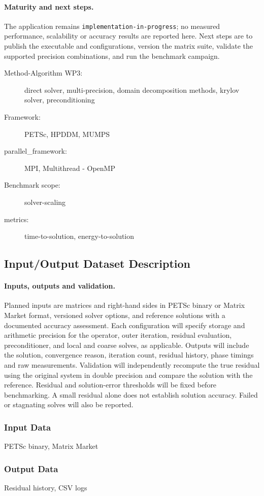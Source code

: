 \paragraph{Maturity and next steps.}
The application remains \texttt{implementation-in-progress}; no measured
performance, scalability or accuracy results are reported here.
Next steps are to publish the executable and configurations, version the
matrix suite, validate the supported precision combinations, and run the
benchmark campaign.

\begin{description}
  \item[Method-Algorithm WP3:] direct solver, multi-precision, domain decomposition methods, krylov solver, preconditioning
  \item[Framework:] PETSc, HPDDM, MUMPS
  \item[parallel\_framework:] MPI, Multithread - OpenMP
  \item[Benchmark scope:] solver-scaling
  \item[metrics:] time-to-solution, energy-to-solution
\end{description}

\subsection{Input/Output Dataset Description}

\paragraph{Inputs, outputs and validation.}
Planned inputs are matrices and right-hand sides in PETSc binary or Matrix
Market format, versioned solver options, and reference solutions with a
documented accuracy assessment. Each configuration will specify storage
and arithmetic precision for the operator, outer iteration, residual
evaluation, preconditioner, and local and coarse solves, as applicable.
Outputs will include the solution, convergence reason, iteration count,
residual history, phase timings and raw measurements.
Validation will independently recompute the true residual using the original
system in double precision and compare the solution with the reference.
Residual and solution-error thresholds will be fixed before benchmarking.
A small residual alone does not establish solution accuracy.
Failed or stagnating solves will also be reported.


\subsubsection{Input Data}
PETSc binary, Matrix Market

\subsubsection{Output Data}
Residual history, CSV logs
